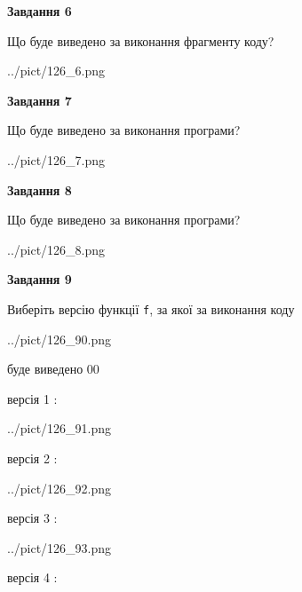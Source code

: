 \documentclass[12pt, ukrainian]{article}
\def\code#1{\Verb!#1!}
\begin{document}
{\begin {large}
{\begin {center}\textbf{Завдання 6}\end {center}}

Що буде виведено за виконання фрагменту коду?\par
\begin{center}
	{../pict/126_6.png}
\end{center}
\newpage

{\begin {center}\textbf{Завдання 7}\end {center}}

Що буде виведено за виконання програми?\par
\begin{center}
	{../pict/126_7.png}
\end{center}
\newpage

{\begin {center}\textbf{Завдання 8}\end {center}}

Що буде виведено за виконання програми?\par
\begin{center}
	{../pict/126_8.png}
\end{center}
\newpage

{\begin {center}\textbf{Завдання 9}\end {center}}

Виберіть версію функції \code{f}, за якої за виконання коду
\begin{center}
	{../pict/126_90.png}
\end{center}
буде виведено 00

\vspace{5mm}
версія 1 :

\begin{center}
	{../pict/126_91.png}
\end{center}
версія 2 :

\begin{center}
	{../pict/126_92.png}
\end{center}
версія 3 :

\begin{center}
	{../pict/126_93.png}
\end{center}
версія 4 :


\end{large}}
\end{document}
